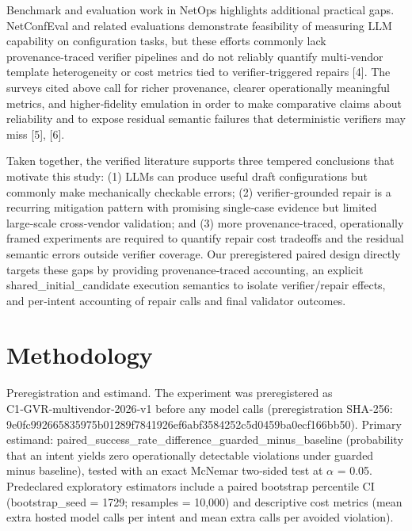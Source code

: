 \documentclass[conference]{IEEEtran}
\begin{document}
Benchmark and evaluation work in NetOps highlights additional practical gaps. NetConfEval and related evaluations demonstrate feasibility of measuring LLM capability on configuration tasks, but these efforts commonly lack provenance‑traced verifier pipelines and do not reliably quantify multi‑vendor template heterogeneity or cost metrics tied to verifier‑triggered repairs [4]. The surveys cited above call for richer provenance, clearer operationally meaningful metrics, and higher‑fidelity emulation in order to make comparative claims about reliability and to expose residual semantic failures that deterministic verifiers may miss [5], [6].

Taken together, the verified literature supports three tempered conclusions that motivate this study: (1) LLMs can produce useful draft configurations but commonly make mechanically checkable errors; (2) verifier‑grounded repair is a recurring mitigation pattern with promising single‑case evidence but limited large‑scale cross‑vendor validation; and (3) more provenance‑traced, operationally framed experiments are required to quantify repair cost tradeoffs and the residual semantic errors outside verifier coverage. Our preregistered paired design directly targets these gaps by providing provenance‑traced accounting, an explicit shared\_initial\_candidate execution semantics to isolate verifier/repair effects, and per‑intent accounting of repair calls and final validator outcomes.

\section{Methodology}
Preregistration and estimand. The experiment was preregistered as C1‑GVR‑multivendor‑2026‑v1 before any model calls (preregistration SHA‑256: 9e0fc992\allowbreak{}66583597\allowbreak{}5b01289f\allowbreak{}7841926e\allowbreak{}f6abf358\allowbreak{}4252c5d0\allowbreak{}459ba0ec\allowbreak{}f166bb50). Primary estimand: paired\_success\_rate\_difference\_guarded\_minus\_baseline (probability that an intent yields zero operationally detectable violations under guarded minus baseline), tested with an exact McNemar two‑sided test at \ensuremath{\alpha} = 0.05. Predeclared exploratory estimators include a paired bootstrap percentile CI (bootstrap\_seed = 1729; resamples = 10,000) and descriptive cost metrics (mean extra hosted model calls per intent and mean extra calls per avoided violation).
\end{document}
